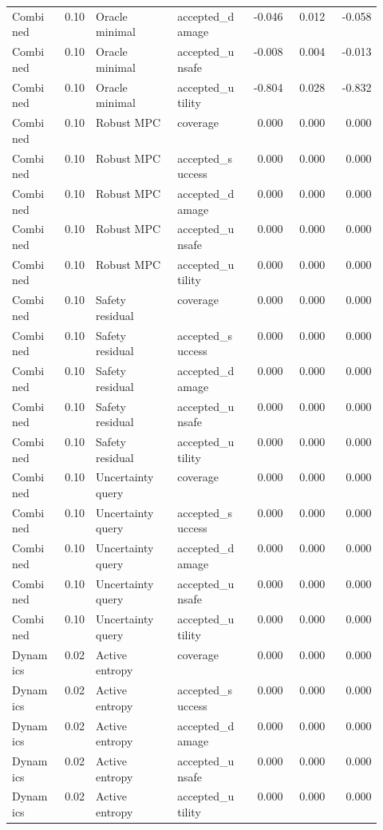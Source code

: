\documentclass{article}
\begin{document}
\begin{center}
\begin{longtable}{p{0.13\linewidth}rp{0.22\linewidth}p{0.19\linewidth}rrr}
Combined & 0.10 & Oracle minimal & accepted\_damage & -0.046 & 0.012 & -0.058\\
Combined & 0.10 & Oracle minimal & accepted\_unsafe & -0.008 & 0.004 & -0.013\\
Combined & 0.10 & Oracle minimal & accepted\_utility & -0.804 & 0.028 & -0.832\\
Combined & 0.10 & Robust MPC & coverage & 0.000 & 0.000 & 0.000\\
Combined & 0.10 & Robust MPC & accepted\_success & 0.000 & 0.000 & 0.000\\
Combined & 0.10 & Robust MPC & accepted\_damage & 0.000 & 0.000 & 0.000\\
Combined & 0.10 & Robust MPC & accepted\_unsafe & 0.000 & 0.000 & 0.000\\
Combined & 0.10 & Robust MPC & accepted\_utility & 0.000 & 0.000 & 0.000\\
Combined & 0.10 & Safety residual & coverage & 0.000 & 0.000 & 0.000\\
Combined & 0.10 & Safety residual & accepted\_success & 0.000 & 0.000 & 0.000\\
Combined & 0.10 & Safety residual & accepted\_damage & 0.000 & 0.000 & 0.000\\
Combined & 0.10 & Safety residual & accepted\_unsafe & 0.000 & 0.000 & 0.000\\
Combined & 0.10 & Safety residual & accepted\_utility & 0.000 & 0.000 & 0.000\\
Combined & 0.10 & Uncertainty query & coverage & 0.000 & 0.000 & 0.000\\
Combined & 0.10 & Uncertainty query & accepted\_success & 0.000 & 0.000 & 0.000\\
Combined & 0.10 & Uncertainty query & accepted\_damage & 0.000 & 0.000 & 0.000\\
Combined & 0.10 & Uncertainty query & accepted\_unsafe & 0.000 & 0.000 & 0.000\\
Combined & 0.10 & Uncertainty query & accepted\_utility & 0.000 & 0.000 & 0.000\\
Dynamics & 0.02 & Active entropy & coverage & 0.000 & 0.000 & 0.000\\
Dynamics & 0.02 & Active entropy & accepted\_success & 0.000 & 0.000 & 0.000\\
Dynamics & 0.02 & Active entropy & accepted\_damage & 0.000 & 0.000 & 0.000\\
Dynamics & 0.02 & Active entropy & accepted\_unsafe & 0.000 & 0.000 & 0.000\\
Dynamics & 0.02 & Active entropy & accepted\_utility & 0.000 & 0.000 & 0.000\\

\end{longtable}
\end{center}
\end{document}
